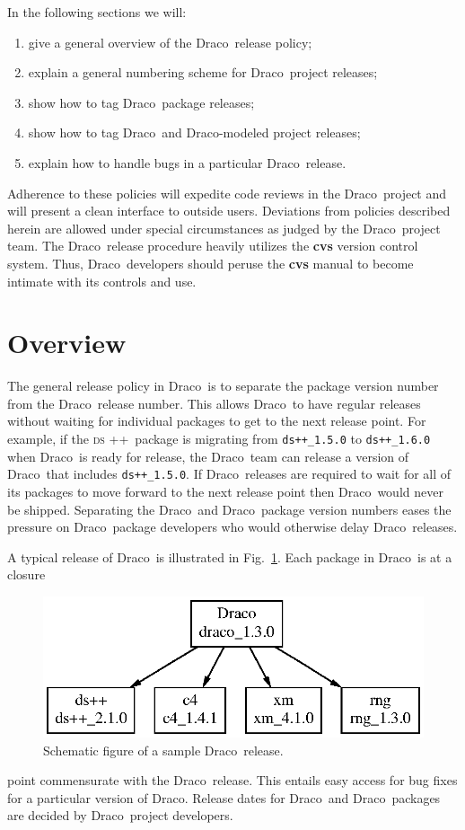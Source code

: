 \documentclass[11pt]{nmemo}
\newcommand{\draco}{{\normalfont\normalsize\textsf Draco}}
\newcommand{\dsxx}{{\normalfont\normalsize\scshape ds\raisebox{.2ex}
  {\scriptsize ++}}}
\begin{document}
In the following sections we will:
\begin{enumerate}
\item give a general overview of the \draco\ release policy;
\item explain a general numbering scheme for \draco\ project releases;
\item show how to tag \draco\ package releases;
\item show how to tag \draco\ and \draco-modeled project releases;
\item explain how to handle bugs in a particular \draco\ release.
\end{enumerate}
Adherence to these policies will expedite code reviews in the \draco\ 
project and will present a clean interface to outside users.
Deviations from policies described herein are allowed under special
circumstances as judged by the \draco\ project team.  The \draco\ 
release procedure heavily utilizes the {\bf cvs} version control
system.  Thus, \draco\ developers should peruse the {\bf cvs} manual
to become intimate with its controls and use.


\section{Overview}

The general release policy in \draco\ is to separate the package
version number from the \draco\ release number.  This allows \draco\
to have regular releases without waiting for individual packages to
get to the next release point.  For example, if the \dsxx\ package is
migrating from \texttt{ds++\_1.5.0} to \texttt{ds++\_1.6.0} when
\draco\ is ready for release, the \draco\ team can release a version
of \draco\ that includes \texttt{ds++\_1.5.0}.  If \draco\ releases are 
required to wait for all of its packages to move forward to the next
release point then \draco\ would never be shipped.  Separating the
\draco\ and \draco\ package version numbers eases the pressure on \draco\
package developers who would otherwise delay \draco\ releases.

A typical release of \draco\ is illustrated in
Fig.~\ref{fig:drelease}.  Each package in \draco\ is at a closure
\begin{figure}
  \centerline{\includegraphics{drelease.eps}}
  \caption{Schematic figure of a sample \draco\ release.}
  \label{fig:drelease}
\end{figure}
point commensurate with the \draco\ release.  This entails easy access
for bug fixes for a particular version of \draco.  Release dates for
\draco\ and \draco\ packages are decided by \draco\ project
developers.
 
\end{document}
